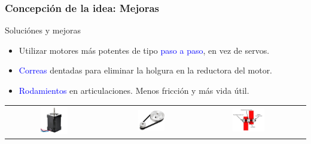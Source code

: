 \documentclass{beamer}
\begin{document}
\begin{frame}
  \frametitle{Concepción de la idea: Mejoras}
  
  \begin{block}{Soluciónes y mejoras}
    \begin{itemize}
    \item Utilizar motores más potentes de tipo \textcolor{blue}{paso a paso}, en vez de servos.
    \item \textcolor{blue}{Correas} dentadas para eliminar la holgura en la reductora del motor.
    \item \textcolor{blue}{Rodamientos} en articulaciones. Menos fricción y más vida útil.
    \end{itemize}
  \end{block}
  \begin{tabular}{cccc}
    \includegraphics[width=0.3\textwidth, valign=m]{figs/nema1760.jpg} & \includegraphics[width=0.3\textwidth, valign=m]{figs/polea.png} 
    & \includegraphics[width=0.35\textwidth, valign=m]{figs/RodamientosBrida.png}
    
\end{tabular}
\end{frame}
\end{document}
